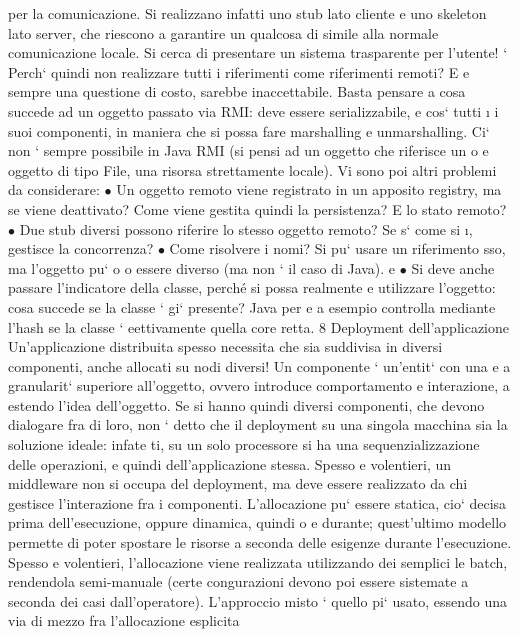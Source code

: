 \documentclass[a4paper,12pt]{article}
\begin{document}
per la comunicazione. Si realizzano
infatti uno stub lato cliente e uno skeleton lato server, che riescono a garantire
un qualcosa di simile alla normale comunicazione locale. Si cerca di presentare
un sistema trasparente per l'utente!
`
Perch` quindi non realizzare tutti i riferimenti come riferimenti remoti? E
e
sempre una questione di costo, sarebbe inaccettabile. Basta pensare a cosa
succede ad un oggetto passato via RMI: deve essere serializzabile, e cos` tutti
\i{}
i suoi componenti, in maniera che si possa fare marshalling e unmarshalling.
Ci` non ` sempre possibile in Java RMI (si pensi ad un oggetto che riferisce un
o
e
oggetto di tipo File, una risorsa strettamente locale). Vi sono poi altri problemi
da considerare:
$\bullet$ Un oggetto remoto viene registrato in un apposito registry, ma se viene
deattivato? Come viene gestita quindi la persistenza? E lo stato remoto?
$\bullet$ Due stub diversi possono riferire lo stesso oggetto remoto? Se s` come si
\i{},
gestisce la concorrenza?
$\bullet$ Come risolvere i nomi? Si pu` usare un riferimento sso, ma l'oggetto pu`
o
o
essere diverso (ma non ` il caso di Java).
e
$\bullet$ Si deve anche passare l'indicatore della classe, perché si possa realmente
e
utilizzare l'oggetto: cosa succede se la classe ` gi` presente? Java per
e a
esempio controlla mediante l'hash se la classe ` eettivamente quella core
retta.
8
Deployment dell'applicazione
Un'applicazione distribuita spesso necessita che sia suddivisa in diversi componenti, anche allocati su nodi diversi! Un
componente ` un'entit` con una
e
a
granularit` superiore all'oggetto, ovvero introduce comportamento e interazione,
a
estendo l'idea dell'oggetto.
Se si hanno quindi diversi componenti, che devono dialogare fra di loro, non
` detto che il deployment su una singola macchina sia la soluzione ideale: infate
ti, su un solo processore si ha una sequenzializzazione delle operazioni, e quindi
dell'applicazione stessa.
Spesso e volentieri, un middleware non si occupa del deployment, ma deve
essere realizzato da chi gestisce l'interazione fra i componenti. L'allocazione
pu` essere statica, cio` decisa prima dell'esecuzione, oppure dinamica, quindi
o
e
durante; quest'ultimo modello permette di poter spostare le risorse a seconda
delle esigenze durante l'esecuzione. Spesso e volentieri, l'allocazione viene realizzata utilizzando dei semplici le
batch, rendendola semi-manuale (certe congurazioni devono poi essere sistemate a seconda dei casi dall'operatore).
L'approccio misto ` quello pi` usato, essendo una via di mezzo fra l'allocazione esplicita
\end{document}

